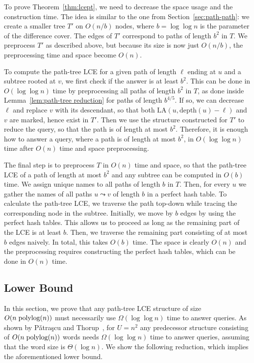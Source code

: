\documentclass [10pt]{article}
\newcommand{\depth}{\ensuremath{\mathrm{depth}}}
\newcommand{\LA}{\ensuremath{\mathrm{LA}}}
\newcommand{\polylog}{\text{\hspace{1mm}polylog}}
\begin{document}
To prove Theorem~\ref{thm:lcept}, we need to decrease the space usage and the construction time. The idea is similar to the one
from Section~\ref{sec:path-path}: we create a smaller tree $T'$ on $O(n/b)$ nodes, where $b=\log\log n$ is the parameter
of the difference cover. The edges of $T'$ correspond to paths of length $b^{2}$ in $T$. We preprocess $T'$ as described
above, but because its size is now just $O(n/b)$, the preprocessing time and space become $O(n)$.

To compute the path-tree LCE for a given path of length $\ell$ ending at $u$ and a subtree rooted at $v$, we first check if the
answer is at least $b^{2}$. This can be done in $O(\log\log n)$ time by preprocessing all paths of length $b^{2}$ in $T$,
as done inside Lemma~\ref{lem:path-tree reduction} for paths of length $b^{4/5}$. If so, we can decrease $\ell$ and
replace $v$ with its descendant, so that both $\LA(u,\depth(u)-\ell)$ and $v$ are marked, hence exist in $T'$. Then
we use the structure constructed for $T'$ to reduce the query, so that the path is of length at most $b^{2}$. Therefore,
it is enough how to answer a query, where a path is of length at most $b^{2}$, in $O(\log\log n)$ time after $O(n)$ time
and space preprocessing.

The final step is to preprocess $T$ in $O(n)$ time and space, so that the path-tree LCE of a path of length at most $b^{2}$
and any subtree can be computed in $O(b)$ time. We assign unique names to all paths of length $b$ in $T$. Then, for every $u$
we gather the names of all paths $u\leadsto v$ of length $b$ in a perfect hash table. To calculate the path-tree LCE, we traverse
the path top-down while tracing the corresponding node in the subtree. Initially, we move by $b$ edges by using the
perfect hash tables. This allows us to proceed as long as the remaining part of the LCE is at least $b$. Then, we traverse the remaining
part consisting of at most $b$ edges naively. In total, this takes $O(b)$ time. The space is clearly $O(n)$ and the preprocessing
requires constructing the perfect hash tables, which can be done in $O(n)$ time.

\subsection{Lower Bound}

In this section, we prove that any path-tree LCE structure of size $O(n \polylog(n))$ must necessarily
use $\Omega(\log\log n)$ time to answer queries. 
As shown by P{\v{a}}tra{\c{s}}cu and Thorup~\cite{PT2006}, for $U=n^{2}$ any predecessor structure consisting
of $O(n \polylog(n))$ words needs $\Omega(\log\log n)$ time to answer queries, assuming that the word size is $\Theta(\log n)$.
We show the following reduction, which implies the aforementioned lower bound.
\end{document}

